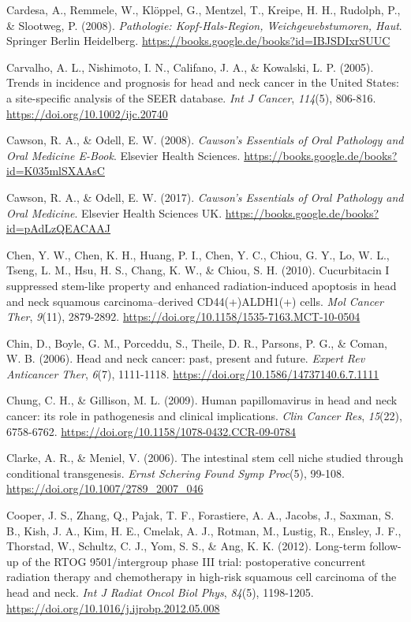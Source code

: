 Cardesa, A., Remmele, W., Klöppel, G., Mentzel, T., Kreipe, H. H., Rudolph, P., \& Slootweg, P. (2008). \emph{Pathologie: Kopf-Hals-Region, Weichgewebstumoren, Haut}. Springer Berlin Heidelberg. \url{https://books.google.de/books?id=IBJSDIxrSUUC}

Carvalho, A. L., Nishimoto, I. N., Califano, J. A., \& Kowalski, L. P. (2005). Trends in incidence and prognosis for head and neck cancer in the United States: a site-specific analysis of the SEER database. \emph{Int J Cancer}, \emph{114}(5), 806-816. \url{https://doi.org/10.1002/ijc.20740}

Cawson, R. A., \& Odell, E. W. (2008). \emph{Cawson's Essentials of Oral Pathology and Oral Medicine E-Book}. Elsevier Health Sciences. \url{https://books.google.de/books?id=K035mlSXAAsC}

Cawson, R. A., \& Odell, E. W. (2017). \emph{Cawson's Essentials of Oral Pathology and Oral Medicine}. Elsevier Health Sciences UK. \url{https://books.google.de/books?id=pAdLzQEACAAJ}

Chen, Y. W., Chen, K. H., Huang, P. I., Chen, Y. C., Chiou, G. Y., Lo, W. L., Tseng, L. M., Hsu, H. S., Chang, K. W., \& Chiou, S. H. (2010). Cucurbitacin I suppressed stem-like property and enhanced radiation-induced apoptosis in head and neck squamous carcinoma--derived CD44(+)ALDH1(+) cells. \emph{Mol Cancer Ther}, \emph{9}(11), 2879-2892. \url{https://doi.org/10.1158/1535-7163.MCT-10-0504}

Chin, D., Boyle, G. M., Porceddu, S., Theile, D. R., Parsons, P. G., \& Coman, W. B. (2006). Head and neck cancer: past, present and future. \emph{Expert Rev Anticancer Ther}, \emph{6}(7), 1111-1118. \url{https://doi.org/10.1586/14737140.6.7.1111}

Chung, C. H., \& Gillison, M. L. (2009). Human papillomavirus in head and neck cancer: its role in pathogenesis and clinical implications. \emph{Clin Cancer Res}, \emph{15}(22), 6758-6762. \url{https://doi.org/10.1158/1078-0432.CCR-09-0784}

Clarke, A. R., \& Meniel, V. (2006). The intestinal stem cell niche studied through conditional transgenesis. \emph{Ernst Schering Found Symp Proc}(5), 99-108. \url{https://doi.org/10.1007/2789_2007_046}

Cooper, J. S., Zhang, Q., Pajak, T. F., Forastiere, A. A., Jacobs, J., Saxman, S. B., Kish, J. A., Kim, H. E., Cmelak, A. J., Rotman, M., Lustig, R., Ensley, J. F., Thorstad, W., Schultz, C. J., Yom, S. S., \& Ang, K. K. (2012). Long-term follow-up of the RTOG 9501/intergroup phase III trial: postoperative concurrent radiation therapy and chemotherapy in high-risk squamous cell carcinoma of the head and neck. \emph{Int J Radiat Oncol Biol Phys}, \emph{84}(5), 1198-1205. \url{https://doi.org/10.1016/j.ijrobp.2012.05.008}

